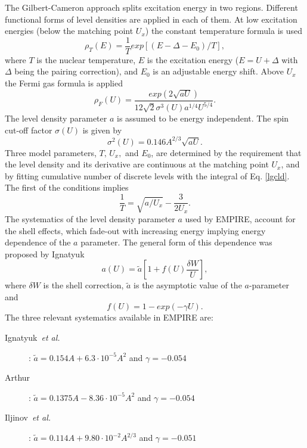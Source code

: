 The Gilbert-Cameron approach \cite{gc} splits excitation energy in two
regions. Different functional forms of level densities%
 are applied in each of them. At low excitation
energies (below the matching point $U_{x}$) the constant temperature formula
is used
\begin{equation}
\rho_{T}(E)=%
\frac{1}{T}exp\left[(E-\Delta-E_{0})/T\right],  \label{lgcld}
\end{equation}
\noindent where $T$ is the nuclear temperature, $E$ is the excitation energy
($E=U+\Delta$ with $\Delta$ being the pairing correction), and $E_{0}$ is an
adjustable energy shift. Above $U_{x}$ the Fermi gas formula is applied
\begin{equation}
\rho_{F}(U)=\frac{exp(2\sqrt{aU})}{12\sqrt{2}\sigma^3(U)a^{1/4}U^{5/4}}.
\label{ferld}
\end{equation}
The level density parameter $a$ is assumed to be energy independent. The
spin cut-off factor $\sigma(U)$ is given by
\begin{equation}
\sigma^{2}(U)=0.146A^{2/3}\sqrt{aU}.  \label{sigld}
\end{equation}
Three model parameters, $T,\, U_{x},$ and $E_{0}$, are determined by the
requirement that the level density and its derivative are continuous at the
matching point $U_{x}$, and by fitting cumulative number of discrete levels
with the integral of Eq. \ref{lgcld}. The first of the conditions implies
\begin{equation}
\frac{1}{T}=\sqrt{a/U_{x}}-\frac{3}{2U_{x}}.  \label{condUT}
\end{equation}
The systematics of the level density parameter $a$ used by EMPIRE, account
for the shell effects, which fade-out with increasing energy implying energy
dependence of the $a$ parameter. The general form of this dependence was
proposed by Ignatyuk~\cite{ignaa}
\begin{equation}
a(U)=\widetilde{a}[1+f(U)\frac{\delta W}{U}],  \label{apiccoloGC}
\end{equation}
\noindent where $\delta W$ is the shell correction, $\widetilde{a}$ is the
asymptotic value of the $a$-parameter and
\begin{equation}
f(U)=1-exp(-\gamma U).  \label{shellGC}
\end{equation}
The three relevant systematics available in EMPIRE are:

\begin{description}
\item[Ignatyuk~\emph{et al.}~\protect\cite{ignaa}] : $\widetilde{a}%
=0.154A+6.3\cdot10^{-5}A^{2}$ and $\gamma=-0.054$

\item[Arthur~\protect\cite{arthura}] : $\widetilde{a}=0.1375A-8.36%
\cdot10^{-5}A^{2}$ and $\gamma=-0.054$

\item[Iljinov~\emph{et al.}~\protect\cite{Mebel}] : $\widetilde{a}%
=0.114A+9.80\cdot10^{-2}A^{2/3}$ and $\gamma=-0.051$
\end{description}

